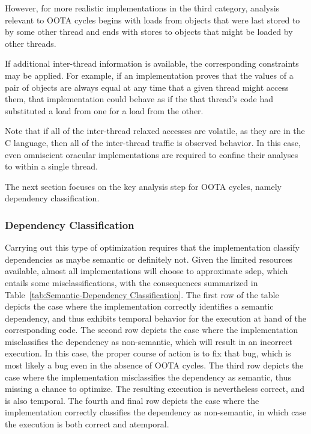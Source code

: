 \documentclass[10]{article}
\begin{document}
However, for more realistic implementations in the third category,
analysis relevant to OOTA cycles begins with loads from objects that were
last stored to by some other thread and ends with stores to objects that
might be loaded by other threads.

If additional inter-thread information is available, the corresponding
constraints may be applied.
For example, if an implementation proves that the values of a pair of
objects are always equal at any time that a given thread might access
them, that implementation could behave as if the that thread's code had
substituted a load from one for a load from the other.

Note that if all of the inter-thread relaxed accesses are volatile,
as they are in the C language, then all of the inter-thread traffic is
observed behavior.
In this case, even omniscient oracular implementations are required
to confine their analyses to within a single thread.

The next section focuses on the key analysis step for OOTA cycles,
namely dependency classification.

\subsubsection{Dependency Classification}
\label{sec:Dependency Classification}

Carrying out this type of optimization requires that the implementation
classify dependencies as maybe semantic or definitely not.
Given the limited resources available, almost all implementations will
choose to approximate sdep, which entails some misclassifications, with
the consequences summarized in
Table~\ref{tab:Semantic-Dependency Classification}.
The first row of the table depicts the case where the implementation
correctly identifies a semantic dependency, and thus exhibits temporal
behavior for the execution at hand of the corresponding code.
The second row depicts the case where the implementation misclassifies
the dependency as non-semantic, which will result in an incorrect
execution.
In this case, the proper course of action is to fix that bug, which is
most likely a bug even in the absence of OOTA cycles.
The third row depicts the case where the implementation misclassifies
the dependency as semantic, thus missing a chance to optimize.
The resulting execution is nevertheless correct, and is also temporal.
The fourth and final row depicts the case where the implementation
correctly classifies the dependency as non-semantic, in which case
the execution is both correct and atemporal.
\end{document}

